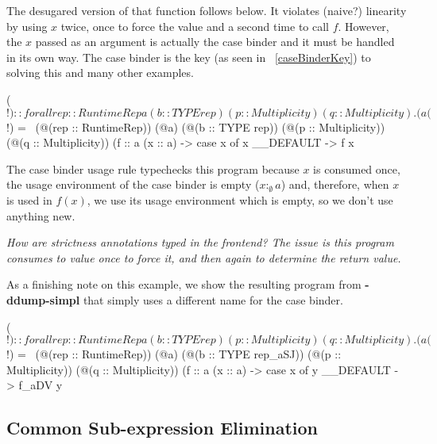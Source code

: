 \documentclass[a4paper, draft]{article}
\begin{document}
The desugared version of that function follows below. It violates (naive?)
linearity by using $x$ twice, once to force the value and a second time to call
$f$. However, the $x$ passed as an argument is actually the case binder and it
must be handled in its own way. The case binder is the key (as seen in ~\ref{caseBinderKey}) to solving this
and many other examples.
\begin{code}
($!)
  :: forall {rep :: RuntimeRep} a (b :: TYPE rep) (p :: Multiplicity)
            (q :: Multiplicity).
     (a %
($!)
  = \ (@(rep :: RuntimeRep))
      (@a)
      (@(b :: TYPE rep))
      (@(p :: Multiplicity))
      (@(q :: Multiplicity))
      (f :: a %
      (x :: a) ->
      case x of x { __DEFAULT -> f x }
\end{code}

%
The case binder usage rule typechecks this program because $x$ is consumed once,
the usage environment of the case binder is empty ($x :_\emptyset a$) and,
therefore, when $x$ is used in $f(x)$, we use its usage environment which is
empty, so we don't use anything new.

\emph{How are strictness annotations typed in the frontend? The issue is this program
consumes to value once to force it, and then again to determine the return
value.}


As a finishing note on this example, we show the resulting program from
\textbf{-ddump-simpl} that simply uses a different name for the case binder.
\begin{code}
($!)
  :: forall {rep :: RuntimeRep} a (b :: TYPE rep)
            (p :: Multiplicity) (q :: Multiplicity).
     (a %
($!)
  = \ (@(rep :: RuntimeRep))
      (@a)
      (@(b :: TYPE rep_aSJ))
      (@(p :: Multiplicity))
      (@(q :: Multiplicity))
      (f :: a %
      (x :: a) ->
      case x of y { __DEFAULT -> f_aDV y }
\end{code}

\subsection{Common Sub-expression Elimination}
\end{document}
